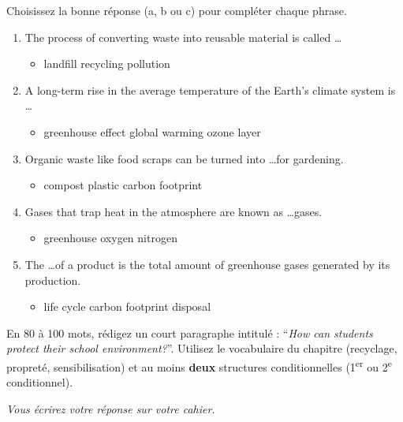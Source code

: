 \documentclass[11pt]{article}
\begin{document}
\begin{exercice}
Choisissez la bonne réponse (a, b ou c) pour compléter chaque phrase.
\begin{enumerate}
    \item The process of converting waste into reusable material is called \dots
    \begin{itemize}
        \item[a)] landfill \quad [b)] recycling \quad [c)] pollution
    \end{itemize}
    \item A long-term rise in the average temperature of the Earth's climate system is \dots
    \begin{itemize}
        \item[a)] greenhouse effect \quad [b)] global warming \quad [c)] ozone layer
    \end{itemize}
    \item Organic waste like food scraps can be turned into \dots for gardening.
    \begin{itemize}
        \item[a)] compost \quad [b)] plastic \quad [c)] carbon footprint
    \end{itemize}
    \item Gases that trap heat in the atmosphere are known as \dots gases.
    \begin{itemize}
        \item[a)] greenhouse \quad [b)] oxygen \quad [c)] nitrogen
    \end{itemize}
    \item The \dots of a product is the total amount of greenhouse gases generated by its production.
    \begin{itemize}
        \item[a)] life cycle \quad [b)] carbon footprint \quad [c)] disposal
    \end{itemize}
\end{enumerate}
\end{exercice}

\begin{exercice}
En 80 à 100 mots, rédigez un court paragraphe intitulé : ``\textit{How can students protect their school environment?}''.
Utilisez le vocabulaire du chapitre (recyclage, propreté, sensibilisation) et au moins \textbf{deux} structures conditionnelles (1\textsuperscript{er} ou 2\textsuperscript{e} conditionnel).
\begin{center}
\textit{Vous écrirez votre réponse sur votre cahier.}
\end{center}
\end{exercice}
\end{document}
